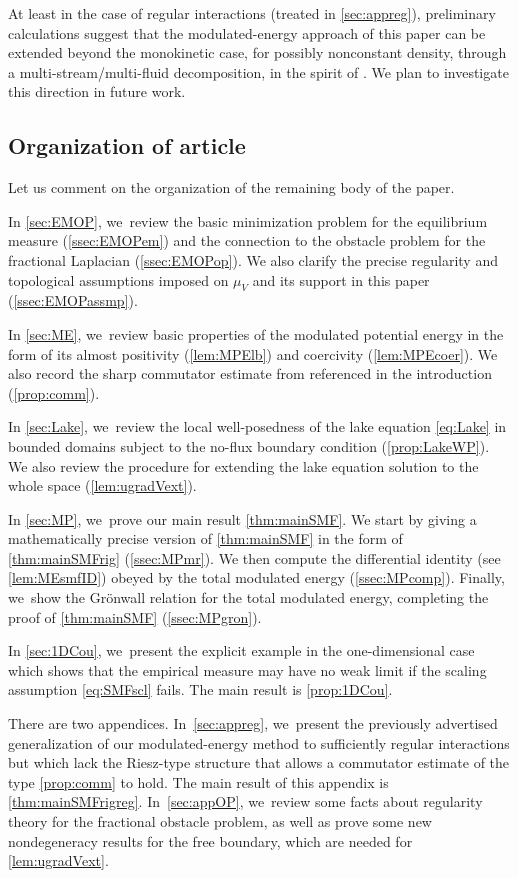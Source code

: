 \documentclass[10pt]{amsart}
\theoremstyle{plain}
\theoremstyle{definition}
\begin{document}
At least in the case of regular interactions (treated in \cref{sec:appreg}), preliminary calculations suggest that the modulated-energy approach of this paper can be extended beyond the monokinetic case, for possibly nonconstant density, through a multi-stream/multi-fluid decomposition, in the spirit of \cite{Grenier1996}. We plan to investigate this direction in future work.

\subsection{Organization of article}\label{ssec:introOrg}
Let us comment on the organization of the remaining body of the paper.

In \cref{sec:EMOP}, we~review the basic minimization problem for the equilibrium measure (\cref{ssec:EMOPem}) and the connection to the obstacle problem for the fractional Laplacian (\cref{ssec:EMOPop}). We also clarify the precise regularity and topological assumptions imposed on $\mu_V$ and its support in this paper (\cref{ssec:EMOPassmp}).

In \cref{sec:ME}, we~review basic properties of the modulated potential energy in the form of its almost positivity (\cref{lem:MPElb}) and coercivity (\cref{lem:MPEcoer}). We also record the sharp commutator estimate from \cite{RS2022} referenced in the introduction (\cref{prop:comm}).

In \cref{sec:Lake}, we~review the local well-posedness of the lake equation \eqref{eq:Lake} in bounded domains subject to the no-flux boundary condition (\cref{prop:LakeWP}). We also review the procedure for extending the lake equation solution to the whole space (\cref{lem:ugradVext}).

In \cref{sec:MP}, we~prove our main result \cref{thm:mainSMF}. We start by giving a mathematically precise version of \cref{thm:mainSMF} in the form of \cref{thm:mainSMFrig} (\cref{ssec:MPmr}). {We then compute the differential identity (see \cref{lem:MEsmfID}) obeyed by the total modulated energy (\cref{ssec:MPcomp}). Finally, we~show the Grönwall relation for the total modulated energy, completing the proof of \cref{thm:mainSMF} (\cref{ssec:MPgron}).}

In \cref{sec:1DCou}, we~present the explicit example in the one-dimensional case which shows that the empirical measure may have no weak limit if the scaling assumption \eqref{eq:SMFscl} fails. The main result is \cref{prop:1DCou}.

There are two appendices. In~\cref{sec:appreg}, we~present the previously advertised generalization of our modulated-energy method to sufficiently regular interactions but which lack the Riesz-type structure that allows a commutator estimate of the type \cref{prop:comm} to hold. The main result of this appendix is \cref{thm:mainSMFrigreg}. In~\cref{sec:appOP}, we~review some facts about regularity theory for the fractional obstacle problem, as well as prove some new nondegeneracy results for the free boundary, which are needed for \cref{lem:ugradVext}.
\end{document}
